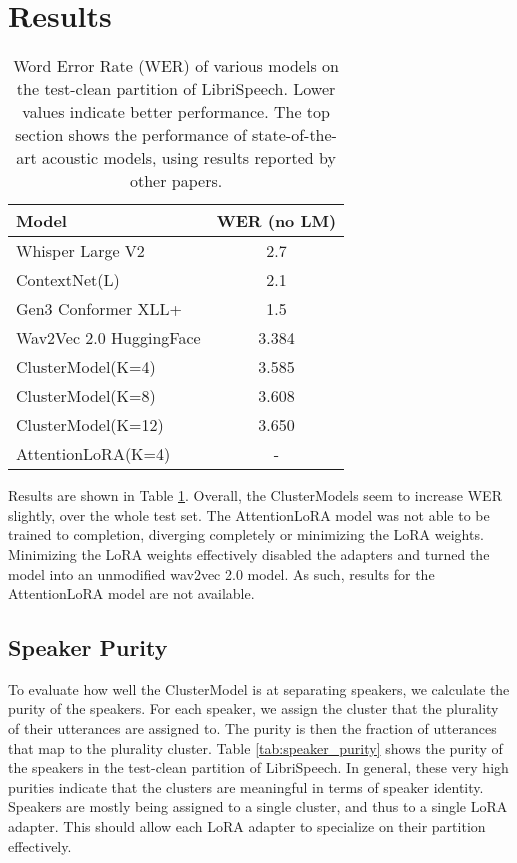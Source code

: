 \section{Results}

\begin{table}[htbp]
  \centering
  \begin{tabular}{lc}
    \toprule
    \textbf{Model} &WER (no LM)\\
    \midrule
    Whisper Large V2 \cite{whisper} &2.7 \\
    ContextNet(L) \cite{contextnet} & 2.1 \\
    Gen3 Conformer XLL+ \cite{conformerxll} & 1.5 \\
    \midrule
    Wav2Vec 2.0 \cite{wav2vec2} HuggingFace &3.384 \\
    ClusterModel(K=4) & 3.585 \\
    ClusterModel(K=8) & 3.608 \\
    ClusterModel(K=12) & 3.650 \\
    AttentionLoRA(K=4) & - \\
    \bottomrule
  \end{tabular}
  \caption{
    Word Error Rate (WER) of various models on the test-clean partition of LibriSpeech.
    Lower values indicate better performance. 
    The top section shows the performance of state-of-the-art acoustic models, using results reported by other papers.
    }
  \label{tab:video_descriptor_comparison}
\end{table}

Results are shown in Table \ref{tab:video_descriptor_comparison}.
Overall, the ClusterModels seem to increase WER slightly, over the whole test set.
The AttentionLoRA model was not able to be trained to completion, diverging completely or minimizing the LoRA weights.
Minimizing the LoRA weights effectively disabled the adapters and turned the model into an unmodified wav2vec 2.0 model.
As such, results for the AttentionLoRA model are not available.

\subsection{Speaker Purity}

To evaluate how well the ClusterModel is at separating speakers, we calculate the purity of the speakers.
For each speaker, we assign the cluster that the plurality of their utterances are assigned to.
The purity is then the fraction of utterances that map to the plurality cluster.
Table \ref{tab:speaker_purity} shows the purity of the speakers in the test-clean partition of LibriSpeech.
In general, these very high purities indicate that the clusters are meaningful in terms of speaker identity.
Speakers are mostly being assigned to a single cluster, and thus to a single LoRA adapter.
This should allow each LoRA adapter to specialize on their partition effectively.

